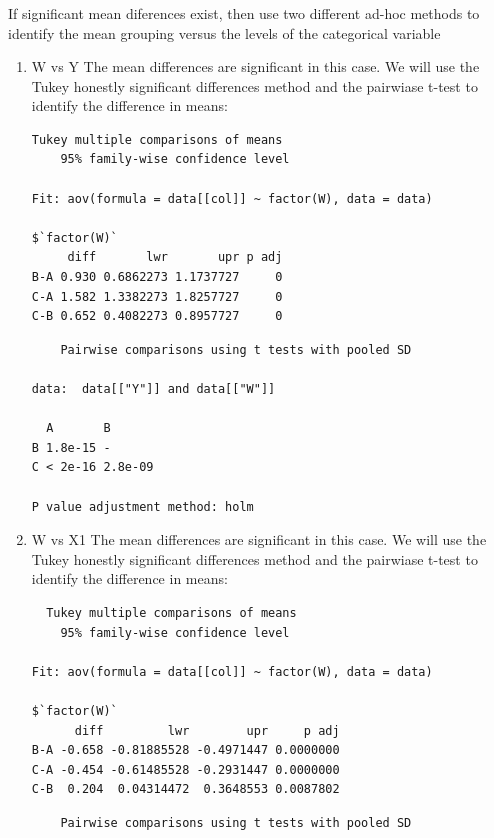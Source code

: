 \documentclass{article}
\begin{document}
\subsubsection{}
If significant mean diferences exist, then use two different ad-hoc methods to
identify the mean grouping versus the levels of the categorical variable

\begin{enumerate}
  \item W vs Y
  The mean differences are significant in this case. We will use the Tukey
  honestly significant differences method and the pairwiase t-test to identify
  the difference in means:
  \begin{lstlisting}
Tukey multiple comparisons of means
    95% family-wise confidence level

Fit: aov(formula = data[[col]] ~ factor(W), data = data)

$`factor(W)`
     diff       lwr       upr p adj
B-A 0.930 0.6862273 1.1737727     0
C-A 1.582 1.3382273 1.8257727     0
C-B 0.652 0.4082273 0.8957727     0
  \end{lstlisting}
  
  \begin{lstlisting}
	Pairwise comparisons using t tests with pooled SD 

data:  data[["Y"]] and data[["W"]] 

  A       B      
B 1.8e-15 -      
C < 2e-16 2.8e-09

P value adjustment method: holm 
  \end{lstlisting}
  
  \item W vs X1
  The mean differences are significant in this case. We will use the Tukey
  honestly significant differences method and the pairwiase t-test to identify
  the difference in means:
  \begin{lstlisting}
  Tukey multiple comparisons of means
    95% family-wise confidence level

Fit: aov(formula = data[[col]] ~ factor(W), data = data)

$`factor(W)`
      diff         lwr        upr     p adj
B-A -0.658 -0.81885528 -0.4971447 0.0000000
C-A -0.454 -0.61485528 -0.2931447 0.0000000
C-B  0.204  0.04314472  0.3648553 0.0087802
  \end{lstlisting}
  
  \begin{lstlisting}
	Pairwise comparisons using t tests with pooled SD 


\end{lstlisting}
\end{enumerate}
\end{document}

